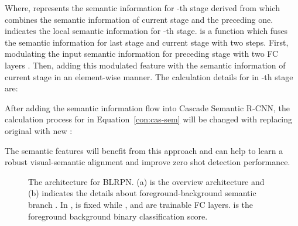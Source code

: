 \documentclass[runningheads]{llncs}
\begin{document}
 Where,  represents the semantic information for -th stage derived from  which combines the semantic information of current stage and the preceding one.  indicates the local semantic information for -th stage.   is a function which fuses the semantic information for last stage and current stage with two steps. First, modulating the input semantic information for preceding stage  with two FC layers . Then, adding this modulated feature with the semantic information of current stage  in an element-wise manner. The calculation details for  in -th stage are:

After adding the semantic information flow into Cascade Semantic R-CNN, the calculation process for  in Equation~\ref{con:cas-sem} will be changed with replacing original  with new :

The semantic features will benefit from this approach and can help to learn a robust visual-semantic alignment and improve zero shot detection performance.
\begin{figure}
\centering
{}
\caption{The architecture for BLRPN. (a) is the overview architecture and (b) indicates the details about foreground-background semantic branch . In ,  is fixed while ,  and  are trainable FC layers.  is the foreground background binary classification score.}
\label{fig:figure3}
\end{figure}
\end{document}
